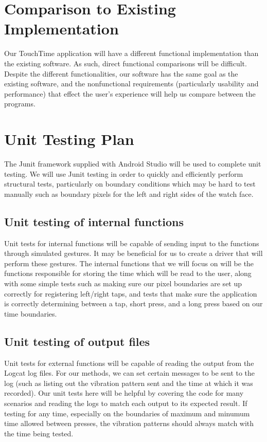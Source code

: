 \section{Comparison to Existing Implementation}	
Our TouchTime application will have a different functional implementation than the existing software. As such, direct functional comparisons will be difficult. Despite the different functionalities, our software has the same goal as the existing software, and the nonfunctional requirements (particularly usability and performance) that effect the user's experience will help us compare between the programs.
				
\section{Unit Testing Plan}
The Junit framework supplied with Android Studio will be used to complete unit testing. We will use Junit testing in order to quickly and efficiently perform structural tests, particularly on boundary conditions which may be hard to test manually such as boundary pixels for the left and right sides of the watch face.
		
\subsection{Unit testing of internal functions}
Unit tests for internal functions will be capable of sending input to the functions through simulated gestures. It may be beneficial for us to create a driver that will perform these gestures. The internal functions that we will focus on will be the functions responsible for storing the time which will be read to the user, along with some simple tests such as making sure our pixel boundaries are set up correctly for registering left/right taps, and tests that make sure the application is correctly determining between a tap, short press, and a long press based on our time boundaries. 
		
\subsection{Unit testing of output files}		
Unit tests for external functions will be capable of reading the output from the Logcat log files. For our methods, we can set certain messages to be sent to the log (such as listing out the vibration pattern sent and the time at which it was recorded). Our unit tests here will be helpful by covering the code for many scenarios and reading the logs to match each output to its expected result. If testing for any time, especially on the boundaries of maximum and minumum time allowed between presses, the vibration patterns should always match with the time being tested.


